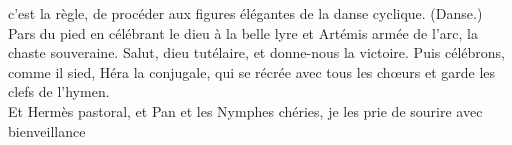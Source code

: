 \documentclass[12pt]{book}%
\newcommand{\passeLigne}[0]{\skipnumbering}%
\newcommand{\ligne}[1]{\setline{#1}\hidenumbering}%
\newcommand{\espace}[1]{\hspace{#1}}%
\newcommand{\francais}[1]{{\policeFr #1}}%
\newcommand{\chantChoeurFr}[1]{%
\hangindent=50pt%
\espace{30pt}%
\francais{#1%
}}%
\newenvironment{groupe}{%
\pstart%
\ledgroup%
}{%
\pend %
}%
\begin{document}
\begin{pages}
\begin{Rightside}
\begin{groupe}%
\chantChoeurFr{c'est la règle,}
\end{groupe}%
\begin{groupe}%
\chantChoeurFr{de procéder aux figures élégantes de la danse cyclique. (Danse.)\\\passeLigne}%
\end{groupe}%
\begin{groupe}%
\chantChoeurFr{\ligne{969}Pars du pied en célébrant le dieu à la belle lyre}
\end{groupe}%
\begin{groupe}%
\chantChoeurFr{et Artémis armée de l'arc, la chaste souveraine.}
\end{groupe}%
\begin{groupe}%
\chantChoeurFr{Salut, dieu tutélaire,}
\end{groupe}%
\begin{groupe}%
\chantChoeurFr{et donne-nous la victoire.}
\end{groupe}%
\begin{groupe}%
\chantChoeurFr{Puis célébrons, comme il sied,}
\end{groupe}%
\begin{groupe}%
\chantChoeurFr{Héra la conjugale,}
\end{groupe}%
\begin{groupe}%
\chantChoeurFr{qui se récrée}
\end{groupe}%
\begin{groupe}%
\chantChoeurFr{avec tous les chœurs et}
\end{groupe}%
\begin{groupe}%
\chantChoeurFr{garde les clefs de l'hymen.\\\passeLigne}%
\end{groupe}%
\begin{groupe}%
\chantChoeurFr{Et Hermès pastoral,}
\end{groupe}%
\begin{groupe}%
\chantChoeurFr{et Pan et les Nymphes chéries,}
\end{groupe}%
\begin{groupe}%
\chantChoeurFr{je les prie de sourire avec bienveillance}
\end{groupe}%

\end{Rightside}
\end{pages}
\end{document}
